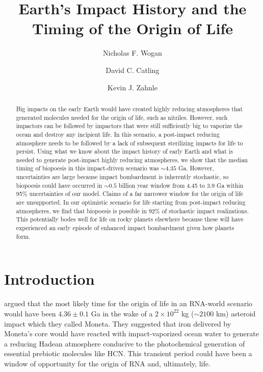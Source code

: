 \documentclass[preprint]{aastex63}
\begin{document}
\title{Earth's Impact History and the Timing of the Origin of Life}

\author{Nicholas F. Wogan}

\author{David C. Catling}

\author{Kevin J. Zahnle}

\begin{abstract}
Big impacts on the early Earth would have created highly reducing atmospheres that generated molecules needed for the origin of life, such as nitriles. However, such impactors can be followed by impactors that were still sufficiently big to vaporize the ocean and destroy any incipient life. In this scenario, a post-impact reducing atmosphere needs to be followed by a lack of subsequent sterilizing impacts for life to persist. Using what we know about the impact history of early Earth and what is needed to generate post-impact highly reducing atmospheres, we show that  the median timing of biopoesis in this impact-driven scenario was $\sim 4.35$ Ga. However, uncertainties are large because impact bombardment is inherently stochastic, so biopoesis could have occurred in $\sim 0.5$ billion year window from 4.45 to 3.9 Ga within 95\% uncertainties of our model. Claims of a far narrower window for the origin of life are unsupported. In our optimistic scenario for life starting from post-impact reducing atmospheres, we find that biopoesis is possible in 92\% of stochastic impact realizations. This potentially bodes well for life on rocky planets elsewhere because these will have experienced an early episode of enhanced impact bombardment given how planets form.
\end{abstract}

\section{Introduction}

\citet{Benner_2020} argued that the most likely time for the origin of life in an RNA-world scenario would have been $4.36 \pm 0.1$ Ga in the wake of a $2 \times 10^{22}$ kg ($\sim 2100$ km) asteroid impact which they called Moneta. They suggested that iron delivered by Moneta's core would have reacted with impact-vaporized ocean water to generate a reducing Hadean atmosphere conducive to the photochemical generation of essential prebiotic molecules like HCN. This transient period could have been a window of opportunity for the origin of RNA and, ultimately, life.
\end{document}
